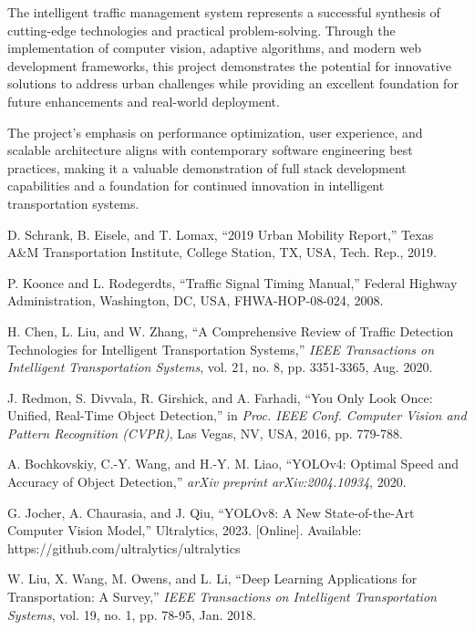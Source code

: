 \documentclass[conference]{IEEEtran}
\begin{document}
The intelligent traffic management system represents a successful synthesis of cutting-edge technologies and practical problem-solving. Through the implementation of computer vision, adaptive algorithms, and modern web development frameworks, this project demonstrates the potential for innovative solutions to address urban challenges while providing an excellent foundation for future enhancements and real-world deployment.

The project's emphasis on performance optimization, user experience, and scalable architecture aligns with contemporary software engineering best practices, making it a valuable demonstration of full stack development capabilities and a foundation for continued innovation in intelligent transportation systems.


\begin{thebibliography}{20}

D. Schrank, B. Eisele, and T. Lomax, ``2019 Urban Mobility Report,'' Texas A\&M Transportation Institute, College Station, TX, USA, Tech. Rep., 2019.

P. Koonce and L. Rodegerdts, ``Traffic Signal Timing Manual,'' Federal Highway Administration, Washington, DC, USA, FHWA-HOP-08-024, 2008.

H. Chen, L. Liu, and W. Zhang, ``A Comprehensive Review of Traffic Detection Technologies for Intelligent Transportation Systems,'' \textit{IEEE Transactions on Intelligent Transportation Systems}, vol. 21, no. 8, pp. 3351-3365, Aug. 2020.

J. Redmon, S. Divvala, R. Girshick, and A. Farhadi, ``You Only Look Once: Unified, Real-Time Object Detection,'' in \textit{Proc. IEEE Conf. Computer Vision and Pattern Recognition (CVPR)}, Las Vegas, NV, USA, 2016, pp. 779-788.

A. Bochkovskiy, C.-Y. Wang, and H.-Y. M. Liao, ``YOLOv4: Optimal Speed and Accuracy of Object Detection,'' \textit{arXiv preprint arXiv:2004.10934}, 2020.

G. Jocher, A. Chaurasia, and J. Qiu, ``YOLOv8: A New State-of-the-Art Computer Vision Model,'' Ultralytics, 2023. [Online]. Available: https://github.com/ultralytics/ultralytics

W. Liu, X. Wang, M. Owens, and L. Li, ``Deep Learning Applications for Transportation: A Survey,'' \textit{IEEE Transactions on Intelligent Transportation Systems}, vol. 19, no. 1, pp. 78-95, Jan. 2018.


\end{thebibliography}
\end{document}

